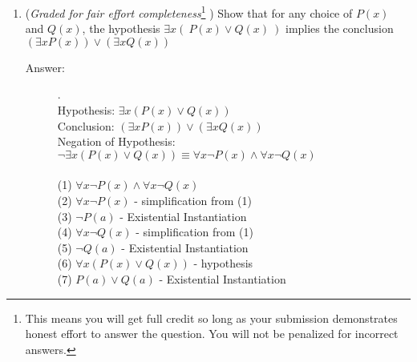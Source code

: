 \documentclass[12pt, oneside]{article}
\begin{document}
\begin{enumerate}
\begin{enumerate}
\begin{description}
\end{description}
\item ({\it Graded for fair effort completeness}\footnote{This means you will get full credit so long as your submission 
demonstrates honest effort to answer the question. You will not be penalized for incorrect answers.} ) Show that for any choice of $P(x)$ and $Q(x)$, the hypothesis $\exists x (~P(x) \lor  Q(x)~)$ implies the conclusion $(\exists x P(x)) \lor (\exists x Q(x))$
\begin{description}
    \item[Answer:] .\\
    Hypothesis: $\exists x (P(x) \lor Q(x))$\\
    Conclusion: $(\exists x P(x)) \lor (\exists x Q(x))$\\
    Negation of Hypothesis: $\lnot \exists x (P(x) \lor Q(x)) \equiv \forall x \lnot P(x) \land \forall x \lnot Q(x)$\\\\
    (1) $\forall x \lnot P(x) \land \forall x \lnot Q(x)$\\
    (2) $\forall x \lnot P(x)$ - simplification from (1)\\
    (3) $\lnot P(a)$ - Existential Instantiation\\
    (4) $\forall x \lnot Q(x)$ - simplification from (1)\\
    (5) $\lnot Q(a)$ - Existential Instantiation\\
    (6) $\forall x (P(x) \lor Q(x))$ - hypothesis\\
    (7) $P(a) \lor Q(a)$ - Existential Instantiation\\

\end{description}

\end{enumerate}


\end{enumerate}
\end{document}
